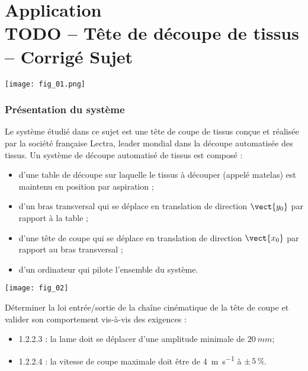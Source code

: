 \chapter*{Application  \\ 
TODO -- Tête de découpe de tissus -- \ifprof Corrigé \else Sujet \fi}

\iflivret {} \else
\ifprof  {} \else \fi
\fi


\marginnote[1cm]{
}


\begin{marginfigure}
\texttt{[image: fig\_01.png]}
\end{marginfigure}




\subsection*{Présentation du système}
\ifprof
\else
Le système étudié dans ce sujet est une tête de coupe de tissus conçue et réalisée par la société
française Lectra, leader mondial dans la découpe automatisée des tissus.
Un système de découpe automatisé de tissus est composé :
\begin{itemize}
\item d'une table de découpe sur laquelle le tissus à découper (appelé matelas) est maintenu en position
par aspiration ;
\item d'un bras transversal qui se déplace en translation de direction $\vect{y_0}$ par rapport à la table ;
\item d'une tête de coupe qui se déplace en translation de direction $\vect{x_0}$ par rapport au bras transversal ;
\item d'un ordinateur qui pilote l’ensemble du système. 
\end{itemize}
\begin{marginfigure}
\texttt{[image: fig\_02]}
\end{marginfigure}

\begin{obj}
Déterminer la loi entrée/sortie de la chaîne cinématique de la tête de coupe et valider son
comportement vis-à-vis des exigences :
\begin{itemize}
\item 1.2.2.3 : la lame doit se déplacer d'une amplitude minimale de $\SI{20}{mm}$;
\item 1.2.2.4 : la vitesse de coupe maximale doit être de \SI{4}{m.s^{-1}} à $\pm\,5\,\%$. 
\end{itemize}
\end{obj}

